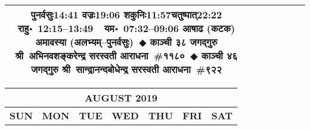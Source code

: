 \documentclass[a3paper,12pt,landscape]{article}
\newcommand{\eventsep}{~$\Diamondblack$ }
\newcommand{\To}{\hspace{1pt}\raisebox{0pt}{\tiny\RIGHTarrow}\hspace{1pt}}
\newcommand{\rahuyama}[2]{%
{राहु॰~\textsf{#1}~~यम॰~\textsf{#2}}
}
\begin{document}
\begin{center}
\begin{tabular}{|c|c|c|c|c|c|c|}
{{\mbox{पुनर्वसुः\To{}\textsf{14:41\hspace{2ex}}}}%
{\mbox{वज्रः\To{}\textsf{19:06\hspace{2ex}}}}%
{\mbox{शकुनिः\To{}\textsf{11:57\hspace{2ex}}}\mbox{चतुष्पात्\To{}\textsf{22:22\hspace{2ex}}}}}%
{\rahuyama{12:15--13:49}{07:32--09:06}}%
{आषाढ (कटक) अमावस्या (अलभ्यम्–पुनर्वसुः)\eventsep काञ्ची ३८ जगद्गुरु श्री~अभिनवशङ्करेन्द्र सरस्वती आराधना~\#{११८०}\eventsep काञ्ची ४६ जगद्गुरु श्री~सान्द्रानन्दबोधेन्द्र सरस्वती आराधना~\#{९२२}}
&
\mbox{}  & %
\mbox{}  & %
\\ \hline
\end{tabular}



\begin{tabular}{|c|c|c|c|c|c|c|}
\multicolumn{7}{c}{\Large \bfseries \sffamily AUGUST 2019}\\[3mm]
\hline
\textbf{\textsf{SUN}} & \textbf{\textsf{MON}} & \textbf{\textsf{TUE}} & \textbf{\textsf{WED}} & \textbf{\textsf{THU}} & \textbf{\textsf{FRI}} & \textbf{\textsf{SAT}} \\ \hline


\end{tabular}
\end{center}
\end{document}
